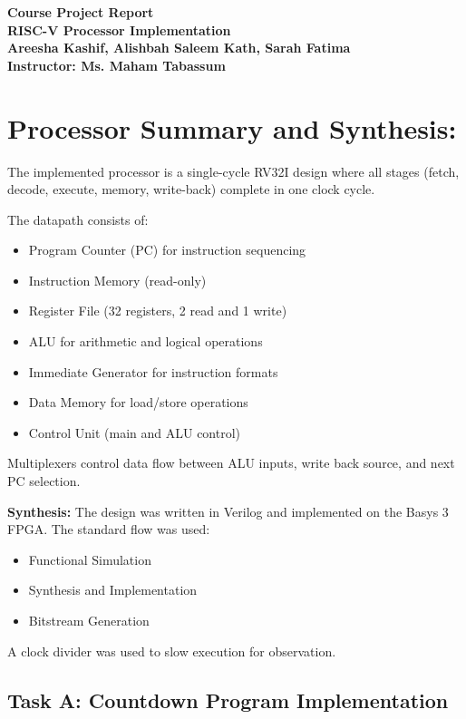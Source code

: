 \documentclass[11pt,a4paper]{article}
\begin{document}
\begin{center}
{\LARGE \textbf{Course Project Report}}\\[0.3em]
\textbf{RISC-V Processor Implementation}\\[1em]

\textbf{Areesha Kashif, Alishbah Saleem Kath, Sarah Fatima}\\
\textbf{Instructor: Ms. Maham Tabassum}
\end{center}

\section{Processor Summary and Synthesis:}

The implemented processor is a single-cycle RV32I design where all stages
(fetch, decode, execute, memory, write-back) complete in one clock cycle.

The datapath consists of:
\begin{itemize}
\item Program Counter (PC) for instruction sequencing
\item Instruction Memory (read-only)
\item Register File (32 registers, 2 read and 1 write)
\item ALU for arithmetic and logical operations
\item Immediate Generator for instruction formats
\item Data Memory for load/store operations
\item Control Unit (main and ALU control)
\end{itemize}

Multiplexers control data flow between ALU inputs, write back source,
and next PC selection.

\textbf{Synthesis:}
The design was written in Verilog and implemented on the Basys 3 FPGA.
The standard flow was used:
\begin{itemize}
\item Functional Simulation
\item Synthesis and Implementation
\item Bitstream Generation
\end{itemize}

A clock divider was used to slow execution for observation.

\subsection*{Task A: Countdown Program Implementation}
\end{document}
